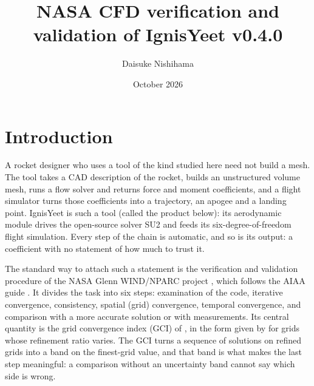\documentclass[twocolumn]{labreport}
\title{NASA CFD verification and validation of IgnisYeet v0.4.0}
\author{Daisuke Nishihama}
\date{October 2026}
\begin{document}
\maketitle

\section{Introduction}
\label{sec:intro}

A rocket designer who uses a tool of the kind studied here need not build a mesh.
The tool takes a CAD description of the rocket, builds an unstructured volume mesh, runs a flow solver and returns force and moment coefficients, and a flight simulator turns those coefficients into a trajectory, an apogee and a landing point.
IgnisYeet is such a tool (called the product below): its aerodynamic module drives the open-source solver SU2 \citep{economon2016} and feeds its six-degree-of-freedom flight simulation.
Every step of the chain is automatic, and so is its output: a coefficient with no statement of how much to trust it.

The standard way to attach such a statement is the verification and validation procedure of the NASA Glenn WIND/NPARC project \citep{nparc_tutorial}, which follows the AIAA guide \citep{aiaa1998}.
It divides the task into six steps: examination of the code, iterative convergence, consistency, spatial (grid) convergence, temporal convergence, and comparison with a more accurate solution or with measurements.
Its central quantity is the grid convergence index (GCI) of \citet{roache1998}, in the form given by \citet{celik2008} for grids whose refinement ratio varies.
The GCI turns a sequence of solutions on refined grids into a band on the finest-grid value, and that band is what makes the last step meaningful: a comparison without an uncertainty band cannot say which side is wrong.
\end{document}
